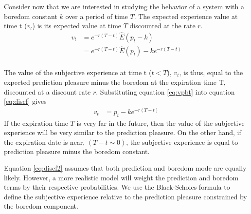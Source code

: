 \documentclass[11pt, onecolumn]{article}
\begin{document}

Consider now that we are interested in studying the behavior of a system with a boredom constant $k$ over a period of time $T$. The expected experience value at time t ($v_t$) is its expected value at time $T$ discounted at the rate $r$.  
\begin{equation}
\begin{split}
    v_t  & =  e^{-r(T-t)}\hat{E}(p_{t} - k)  \\
       & = e^{-r(T-t)}\hat{E}(p_{t}) - k e^{-r(T-t)} \\
\end{split}
\label{eq:discf}
\end{equation}

The value of the subjective experience at time t ($t <T$), $v_t$, is thus, equal to the expected prediction pleasure minus the boredom at the expiration time T, discounted at a discount rate $r$. Substituting equation \ref{eq:vpbt} into equation \ref{eq:discf} gives
\begin{equation}
\begin{split}
    v_t  & =  p_{t} - k e^{-r(T-t)}
\end{split}
\label{eq:discf2}
\end{equation}
If the expiration time $T$ is very far in the future, then the value of the subjective experience will be very similar to the prediction pleasure. On the other hand, if the expiration date is near, $(T-t \sim 0)$, the subjective experience is equal to prediction pleasure minus the boredom constant. 

Equation \ref{eq:discf2} assumes that both prediction and boredom mode are equally likely. However, a more realistic model will weight the prediction and boredom terms by their respective probabilities. We use the Black-Scholes formula to define the subjective experience relative to the prediction pleasure constrained by the boredom component. 
\end{document}

